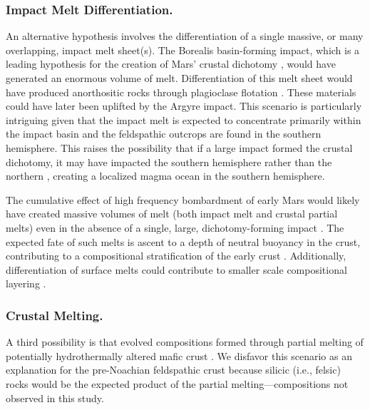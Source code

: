 \documentclass[12pt]{article}
\begin{document}
\subsubsection*{Impact Melt Differentiation.} 

An alternative hypothesis involves the differentiation of a single massive, or many overlapping, impact melt sheet(s). The Borealis basin-forming impact, which is a leading hypothesis for the creation of Mars' crustal dichotomy \citep{Don1984, Andrews-Hanna2008, Marinova2008, Nimmo2008}, would have generated an enormous volume of melt. Differentiation of this melt sheet would have produced anorthositic rocks through plagioclase flotation \citep{Koeppel2020, Manske2021}. These materials could have later been uplifted by the Argyre impact. This scenario is particularly intriguing given that the impact melt is expected to concentrate primarily within the impact basin \citep{Marinova2008, Ballantyne2023} and the feldspathic outcrops are found in the southern hemisphere. This raises the possibility that if a large impact formed the crustal dichotomy, it may have impacted the southern hemisphere rather than the northern \citep{Reese2010, Golabek2011, Leone2014, Ballantyne2023, Cheng2024}, creating a localized magma ocean in the southern hemisphere.

The cumulative effect of high frequency bombardment of early Mars would likely have created massive volumes of melt (both impact melt and crustal partial melts) even in the absence of a single, large, dichotomy-forming impact \citep{Koeppel2020, Manske2021, Black2024}. The expected fate of such melts is ascent to a depth of neutral buoyancy in the crust, contributing to a compositional stratification of the early crust \citep{Black2024}. Additionally, differentiation of surface melts could contribute to smaller scale compositional layering \citep{Koeppel2020}.

\subsubsection*{Crustal Melting.} 

A third possibility is that evolved compositions formed through partial melting of potentially hydrothermally altered mafic crust \citep{BonnetGibet2025, Bernadet2025}. We disfavor this scenario as an explanation for the pre-Noachian feldspathic crust because silicic (i.e., felsic) rocks would be the expected product of the partial melting---compositions not observed in this study.
\end{document}
